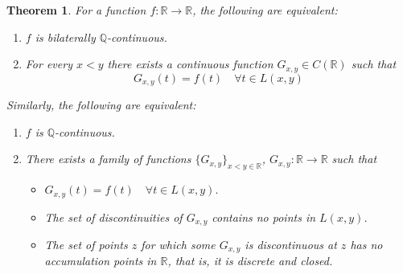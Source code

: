 \documentclass[11pt]{amsart} %
\newtheorem{theorem}{Theorem}[section]
\theoremstyle{definition}
\newcommand{\R}{\mathbb{R}}
\begin{document}
\begin{theorem}%
For a function $f:\mathbb{R}\rightarrow\mathbb{R}$, the following are equivalent:
\begin{enumerate}
\item[(1)] $f$ is bilaterally $\mathbb{Q}$-continuous.
\item[(2)] For every $x<y$ there exists a continuous function $G_{x,y}\in C(\mathbb{R})$ such that
\begin{equation} 
G_{x,y}(t)=f(t) \quad \forall t\in L(x,y) 
\end{equation} 
\end{enumerate}
Similarly, the following are equivalent:
\begin{enumerate}
\item[(3)] $f$ is $\mathbb{Q}$-continuous.
\item[(4)] There exists a family of functions $\{G_{x,y}\}_{x<y\in\mathbb{R}}$, $G_{x,y}:\mathbb{R}\rightarrow\mathbb{R}$ such that
\begin{itemize}
\item $G_{x,y}(t)=f(t) \quad \forall t\in L(x,y).$
\item The set of discontinuities of $G_{x,y}$ contains no points in $L(x,y)$.
\item The set of points $z$ for which some $G_{x,y}$ is discontinuous at $z$ has no accumulation points in $\R$, that is, it is discrete and closed. 
\end{itemize}
\end{enumerate}
\label{character-qcont}
\end{theorem}
\end{document}
